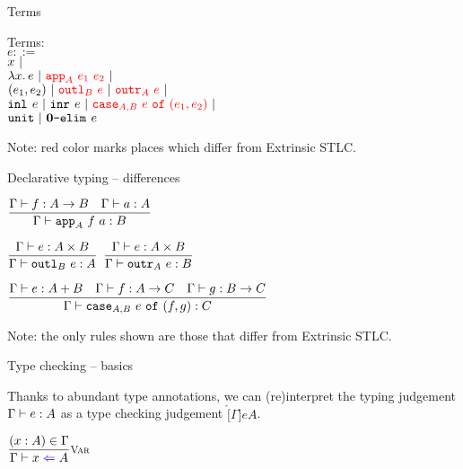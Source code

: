 \documentclass{beamer}
\begin{document}
\begin{frame}{Terms}

Terms: \\
$e ::=$ \\
\qquad $x \ |\ $ \\
\qquad $\fun{x}{e} \pipe \termdiff{\app[A]{e_1}{e_2}} \pipe$ \\
\qquad $\pair{e_1}{e_2} \pipe \termdiff{\outl[B]{e}} \pipe \termdiff{\outr[A]{e}} \pipe$ \\
\qquad $\inl{e} \pipe \inr{e} \pipe \termdiff{\caseannot{A}{B}{e}{e_1}{e_2}} \pipe$ \\
\qquad $\texttt{unit} \ |\  \textbf{0}\texttt{-elim}_{}\ e$

\vspace{2em}

Note: red color marks places which differ from Extrinsic STLC.

\end{frame}

\begin{frame}{Declarative typing -- differences}

\begin{center}
  $\infrule{\typing{f}{\Fun{A}{B}} \quad \typing{a}{A}}{\typing{\app[A]{f}{a}}{B}}$

  \vspace{2em}

  $\infrule{\typing{e}{\Prod{A}{B}}}{\typing{\outl[B]{e}}{A}}$ \quad
  $\infrule{\typing{e}{\Prod{A}{B}}}{\typing{\outr[A]{e}}{B}}$ \quad

  \vspace{2em}

  $\infrule{\typing{e}{\Sum{A}{B}} \quad \typing{f}{\Fun{A}{C}} \quad \typing{g}{\Fun{B}{C}}}{\typing{\caseannot{A}{B}{e}{f}{g}}{C}}$
\end{center}

\vspace{2em}

Note: the only rules shown are those that differ from Extrinsic STLC.

\end{frame}

\begin{frame}{Type checking -- basics}

Thanks to abundant type annotations, we can (re)interpret the typing judgement $\typing[\Gamma]{e}{A}$ as a type checking judgement $\check[\Gamma]{e}{A}$.

\vspace{2em}

\begin{center}
  $\infrule[Var]{\sidecond{(x : A) \in \Gamma}}{\check{x}{A}}$
\end{center}

\end{frame}
\end{document}
